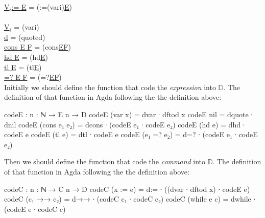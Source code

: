 \documentclass{jfrarticle}
\newcommand{\md}[1]{$\mathds{#1}$}
\begin{document}
\indent\hspace{3cm}\underline{V$_i$:= E}\hspace{2.6cm} = \hspace{0.5cm} (:=(vari)\underline{E})\\\\
\indent\hspace{3cm}\underline{V$_i$}\hspace{3.3cm} = \hspace{0.5cm} (vari)\\
\indent\hspace{3cm}\underline{d}\hspace{3.5cm} = \hspace{0.5cm} (quoted)\\
\indent\hspace{3cm}\underline{cons E F}\hspace{2.3cm} = \hspace{0.5cm} (cons\underline{EF})\\
\indent\hspace{3cm}\underline{hd E}\hspace{2.95cm} = \hspace{0.5cm} (hd\underline{E})\\
\indent\hspace{3cm}\underline{tl E}\hspace{3.1cm} = \hspace{0.5cm} (tl\underline{E})\\
\indent\hspace{3cm}\underline{=? E F}\hspace{2.55cm} = \hspace{0.5cm} (=?\underline{EF})\\
Initially we should define the function that code the \textit{expression} into \md{D}.
The definition of that function in Agda following the the definition above:
\begin{code}[fontsize=\small]
codeE : {n : ℕ} → E n → D
codeE (var x) = dvar ∙ dftod x
codeE nil = dquote ∙ dnil
codeE (cons e₁ e₂) = dcons ∙ (codeE e₁ ∙ codeE e₂)
codeE (hd e) = dhd ∙ codeE e
codeE (tl e) = dtl ∙ codeE e
codeE (e₁ =? e₂) = d=? ∙ (codeE e₁ ∙ codeE e₂)

\end{code}
Then we should define the function that code the \textit{command} into \md{D}.
The definition of that function in Agda following the the definition above:
\begin{code}[fontsize=\small]
codeC : {n : ℕ} → C n → D
codeC (x := e) = d:= ∙ ((dvar ∙ dftod x) ∙ codeE e)
codeC (c₁ →→ c₂) = d→→ ∙ (codeC c₁ ∙ codeC c₂)
codeC (while e c) = dwhile ∙ (codeE e ∙ codeC c)

\end{code}
\end{document}
